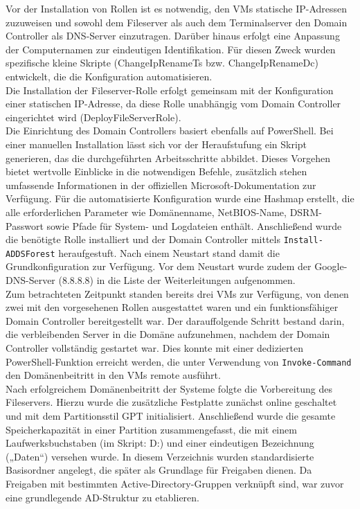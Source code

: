 \documentclass[a4paper,12pt]{article}
\begin{document}
Vor der Installation von Rollen ist es notwendig, den VMs statische IP-Adressen zuzuweisen und sowohl dem Fileserver als auch dem Terminalserver den Domain Controller als DNS-Server einzutragen. 
Darüber hinaus erfolgt eine Anpassung der Computernamen zur eindeutigen Identifikation. 
Für diesen Zweck wurden spezifische kleine Skripte (ChangeIpRenameTs bzw. ChangeIpRenameDc) entwickelt, die die Konfiguration automatisieren.\\
Die Installation der Fileserver-Rolle erfolgt gemeinsam mit der Konfiguration einer statischen IP-Adresse, da diese Rolle unabhängig vom Domain Controller eingerichtet wird (DeployFileServerRole).\\

Die Einrichtung des Domain Controllers basiert ebenfalls auf PowerShell. 
Bei einer manuellen Installation lässt sich vor der Heraufstufung ein Skript generieren, das die durchgeführten Arbeitsschritte abbildet. 
Dieses Vorgehen bietet wertvolle Einblicke in die notwendigen Befehle, zusätzlich stehen umfassende Informationen in der offiziellen Microsoft-Dokumentation zur Verfügung. 
Für die automatisierte Konfiguration wurde eine Hashmap erstellt, die alle erforderlichen Parameter wie Domänenname, NetBIOS-Name, DSRM-Passwort sowie Pfade für System- und Logdateien enthält. 
Anschließend wurde die benötigte Rolle installiert und der Domain Controller mittels \lstinline|Install-ADDSForest| heraufgestuft. 
Nach einem Neustart stand damit die Grundkonfiguration zur Verfügung. Vor dem Neustart wurde zudem der Google-DNS-Server (8.8.8.8) in die Liste der Weiterleitungen aufgenommen.\\

Zum betrachteten Zeitpunkt standen bereits drei VMs zur Verfügung, von denen zwei mit den vorgesehenen Rollen ausgestattet waren und ein funktionsfähiger Domain Controller bereitgestellt war. 
Der darauffolgende Schritt bestand darin, die verbleibenden Server in die Domäne aufzunehmen, nachdem der Domain Controller vollständig gestartet war. 
Dies konnte mit einer dedizierten PowerShell-Funktion erreicht werden, die unter Verwendung von \lstinline|Invoke-Command| den Domänenbeitritt in den VMs remote ausführt.\\

Nach erfolgreichem Domänenbeitritt der Systeme folgte die Vorbereitung des Fileservers. 
Hierzu wurde die zusätzliche Festplatte zunächst online geschaltet und mit dem Partitionsstil GPT initialisiert. 
Anschließend wurde die gesamte Speicherkapazität in einer Partition zusammengefasst, die mit einem Laufwerksbuchstaben (im Skript: D:) und einer eindeutigen Bezeichnung („Daten“) versehen wurde. 
In diesem Verzeichnis wurden standardisierte Basisordner angelegt, die später als Grundlage für Freigaben dienen. 
Da Freigaben mit bestimmten Active-Directory-Gruppen verknüpft sind, war zuvor eine grundlegende AD-Struktur zu etablieren.\\
\end{document}
